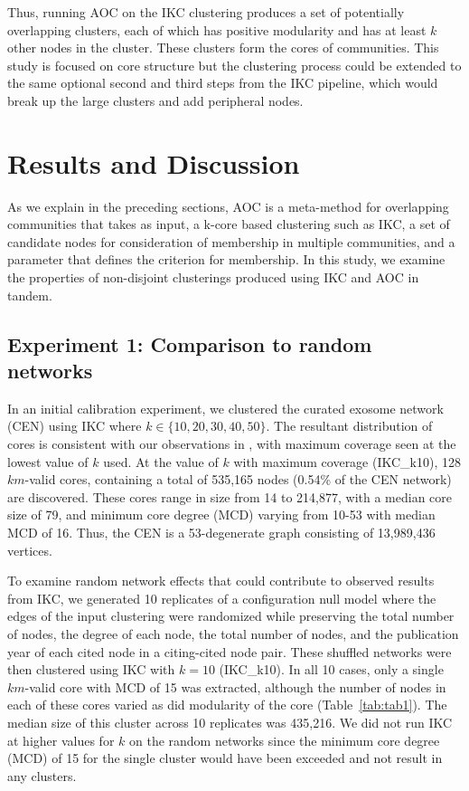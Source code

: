 \documentclass[12pt, oneside]{article}   	%
\begin{document}
Thus, running   AOC on the IKC clustering produces a set of potentially overlapping clusters, each of which has positive modularity and has at least $k$ other nodes in the cluster. These clusters form the cores of communities.  This study is focused on core structure but the clustering process could be extended to the same optional second and third steps from the IKC pipeline, which would break up the large clusters and add peripheral nodes. 

\section{Results and Discussion}

As we explain in the preceding sections, AOC is a meta-method for overlapping communities that takes as input, a k-core based clustering such as IKC, a set of candidate nodes for consideration of membership in multiple communities, and a parameter that defines the criterion for membership. In this study, we examine the properties of non-disjoint clusterings produced using IKC and AOC in tandem. 

\subsection{Experiment 1: Comparison to random networks} In an initial calibration experiment, we clustered the curated exosome network (CEN) using IKC where $k \in {\{10,20,30,40, 50\}}$. The resultant distribution of cores is consistent with our observations in \cite[Figure~3]{Wedell2022}, with maximum coverage seen at the lowest value of $k$ used. At the value of $k$ with maximum coverage (IKC\_k10), 128 $km$-valid cores, containing a total of 535,165 nodes (0.54\% of the CEN network) are discovered. These cores range in size from 14 to 214,877, with a median core size of 79, and minimum core degree (MCD) varying from 10-53 with median MCD of 16. Thus, the CEN is a 53-degenerate graph consisting of 13,989,436 vertices.

To examine random network effects that could contribute to observed results from IKC, we generated 10 replicates of a configuration null model where the edges of the input clustering were randomized while preserving the total number of nodes, the degree of each node, the total number of nodes, and the publication year of each cited node in a citing-cited node pair. These shuffled networks were then clustered using IKC with  $k=10$ (IKC\_k10). In all 10 cases, only a single $km$-valid core with MCD of 15 was extracted, although the number of nodes in each of these cores varied as did modularity of the core (Table~\ref{tab:tab1}). The median size of this cluster across 10 replicates was 435,216. We did not run IKC at higher values for $k$ on the random networks since  the minimum core degree (MCD) of 15 for the single cluster would have been exceeded and not result in any clusters. 
\end{document}
